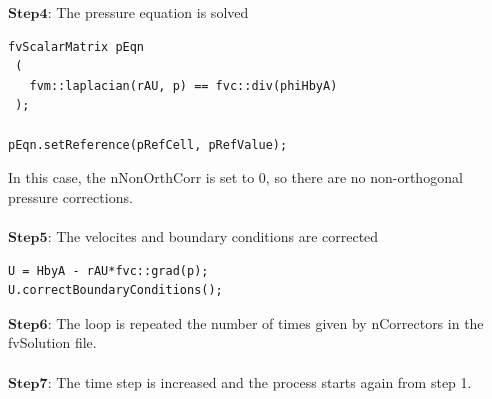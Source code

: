 \documentclass[a4paper,english,12pt,twoside]{article}
\begin{document}
$\mathbf{Step 4}$: The pressure equation is solved
\begin{lstlisting}[style=python]
fvScalarMatrix pEqn
 (
   fvm::laplacian(rAU, p) == fvc::div(phiHbyA)
 );

pEqn.setReference(pRefCell, pRefValue);
\end{lstlisting}
In this case, the nNonOrthCorr is set to 0, so there are no non-orthogonal pressure corrections.\\
\\
$\mathbf{Step 5}$: The velocites and boundary conditions are corrected
\begin{lstlisting}[style=python]
 U = HbyA - rAU*fvc::grad(p);
U.correctBoundaryConditions();
\end{lstlisting}
$\mathbf{Step 6}$: The loop is repeated the number of times given by nCorrectors in the fvSolution file.\\
\\
$\mathbf{Step 7}$: The time step is increased and the process starts again from step 1.

\newpage
\end{document}
